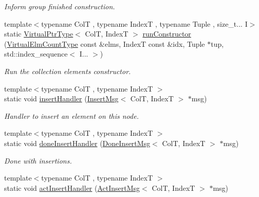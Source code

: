 \begin{DoxyCompactItemize}
\begin{DoxyCompactList}\small\item\em Inform group finished construction. \end{DoxyCompactList}\item 
{\footnotesize template$<$typename ColT , typename IndexT , typename Tuple , size\+\_\+t... I$>$ }\\static \hyperlink{structvt_1_1vrt_1_1collection_1_1_collection_manager_a1da9015e52d6ecca955f57b59aab0b82}{Virtual\+Ptr\+Type}$<$ ColT, IndexT $>$ \hyperlink{structvt_1_1vrt_1_1collection_1_1_collection_manager_a52ce99a3c227bfd77089725c3a173373}{run\+Constructor} (\hyperlink{namespacevt_ac115668758184050beff7a9281a2c490}{Virtual\+Elm\+Count\+Type} const \&elms, IndexT const \&idx, Tuple $\ast$tup, std\+::index\+\_\+sequence$<$ I... $>$)
\begin{DoxyCompactList}\small\item\em Run the collection element\textquotesingle{}s constructor. \end{DoxyCompactList}\item 
{\footnotesize template$<$typename ColT , typename IndexT $>$ }\\static void \hyperlink{structvt_1_1vrt_1_1collection_1_1_collection_manager_afae2bb212583b7a9c6d73722c66961ef}{insert\+Handler} (\hyperlink{structvt_1_1vrt_1_1collection_1_1_insert_msg}{Insert\+Msg}$<$ ColT, IndexT $>$ $\ast$msg)
\begin{DoxyCompactList}\small\item\em Handler to insert an element on this node. \end{DoxyCompactList}\item 
{\footnotesize template$<$typename ColT , typename IndexT $>$ }\\static void \hyperlink{structvt_1_1vrt_1_1collection_1_1_collection_manager_ad0d2174c1605c18dfdc028679f1505ae}{done\+Insert\+Handler} (\hyperlink{structvt_1_1vrt_1_1collection_1_1_done_insert_msg}{Done\+Insert\+Msg}$<$ ColT, IndexT $>$ $\ast$msg)
\begin{DoxyCompactList}\small\item\em Done with insertions. \end{DoxyCompactList}\item 
{\footnotesize template$<$typename ColT , typename IndexT $>$ }\\static void \hyperlink{structvt_1_1vrt_1_1collection_1_1_collection_manager_a0c2b3a0d98264432181392ff178d5782}{act\+Insert\+Handler} (\hyperlink{structvt_1_1vrt_1_1collection_1_1_act_insert_msg}{Act\+Insert\+Msg}$<$ ColT, IndexT $>$ $\ast$msg)

\end{DoxyCompactItemize}
